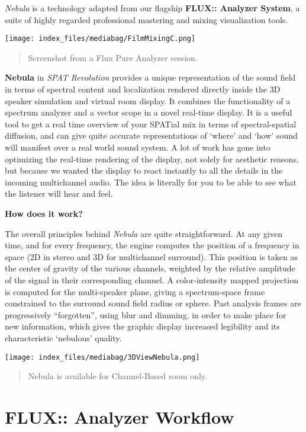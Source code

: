 \documentclass[
  letterpaper,
  DIV=11,
  numbers=noendperiod]{scrreport}
\begin{document}
\emph{Nebula} is a technology adapted from our flagship \textbf{FLUX::
Analyzer System}, a suite of highly regarded professional mastering and
mixing visualization tools.

\texttt{[image: index\_files/mediabag/FilmMixingC.png]}

\begin{quote}
Screenshot from a Flux Pure Analyzer session.
\end{quote}

\textbf{Nebula} in \emph{SPAT Revolution} provides a unique
representation of the sound field in terms of spectral content and
localization rendered directly inside the 3D speaker simulation and
virtual room display. It combines the functionality of a spectrum
analyzer and a vector scope in a novel real-time display. It is a useful
tool to get a real time overview of your SPATial mix in terms of
spectral-spatial diffusion, and can give quite accurate representations
of `where' and `how' sound will manifest over a real world sound system.
A lot of work has gone into optimizing the real-time rendering of the
display, not solely for aesthetic reasons, but because we wanted the
display to react instantly to all the details in the incoming
multichannel audio. The idea is literally for you to be able to see what
the listener will hear and feel.

\textbf{How does it work?}

The overall principles behind \emph{Nebula} are quite straightforward.
At any given time, and for every frequency, the engine computes the
position of a frequency in space (2D in stereo and 3D for multichannel
surround). This position is taken as the center of gravity of the
various channels, weighted by the relative amplitude of the signal in
their corresponding channel. A color-intensity mapped projection is
computed for the multi-speaker plane, giving a spectrum-space frame
constrained to the surround sound field radius or sphere. Past analysis
frames are progressively ``forgotten'', using blur and dimming, in order
to make place for new information, which gives the graphic display
increased legibility and its characteristic `nebulous' quality.

\texttt{[image: index\_files/mediabag/3DViewNebula.png]}

\begin{quote}
Nebula is available for Channel-Based room only.
\end{quote}

\hypertarget{flux-analyzer-workflow}{%
\chapter{FLUX:: Analyzer Workflow}\label{flux-analyzer-workflow}}
\end{document}
